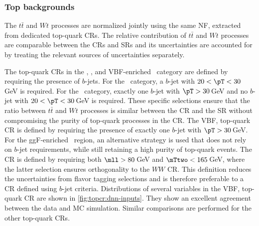 \subsubsection{Top backgrounds}
The $t\bar{t}$ and $Wt$ processes are normalized jointly using the same NF, extracted from dedicated top-quark CRs.
The relative contribution of $t\bar{t}$ and $Wt$ processes are comparable between the CRs and SRs and its uncertainties are accounted for by treating the relevant sources of uncertainties separately.

The top-quark CRs in the \ZeroJet, \OneJet, and VBF-enriched \TwoJet\ category are defined by requiring the presence of $b$-jets.
For the \ZeroJet\ category, a $b$-jet with $20 < \pT < 30\,$GeV is required.
For the \OneJet\ category, exactly one $b$-jet with $\pT > 30\,$GeV and no $b$-jet with $20 < \pT < 30\,$GeV is required. These specific selections ensure that the ratio between $t\bar{t}$ and $Wt$ processes is similar between the CR and the SR without compromising the purity of top-quark processes in the CR.
The VBF, top-quark CR is defined by requiring the presence of exactly one $b$-jet with $\pT > 30\,$GeV.
For the ggF-enriched \TwoJet\ region, an alternative strategy is used that does not rely on $b$-jet requirements, while still retaining a high purity of top-quark events. The CR is defined by requiring both $\mll > 80\,$GeV and $\mTtwo < 165\,$GeV, where the latter selection ensures orthogonality to the $WW$ CR. This definition reduces the uncertainties from flavor tagging selections and is therefore preferable to a CR defined using $b$-jet criteria.
Distributions of several variables in the VBF, top-quark CR are shown in \cref{fig:topcr:dnn-inputs}. They show an excellent agreement between the data and MC simulation. Similar comparisons are performed for the other top-quark CRs.

